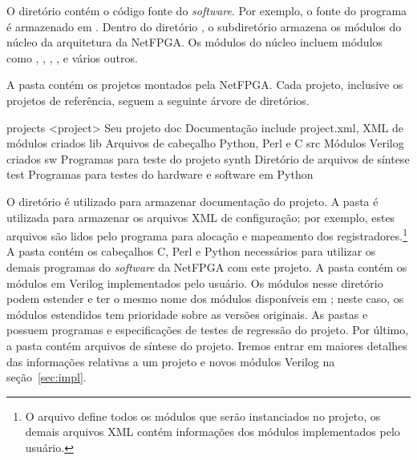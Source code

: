 O diretório  contém o código fonte do \emph{software}.  Por
exemplo, o fonte do programa  é armazenado em
.  Dentro do diretório , o
subdiretório  armazena os módulos do núcleo da
arquitetura da NetFPGA.  Os módulos do núcleo incluem módulos como
, , ,
,  e vários outros.

A pasta  contém os projetos montados pela NetFPGA.
Cada projeto, inclusive os projetos de referência, seguem a seguinte
árvore de diretórios.

\begin{verbnobox}[\footnotesize]
   projects
      <project>        {Seu projeto}
         doc           {Documentação}
         include       {project.xml, XML de módulos criados}
         lib           {Arquivos de cabeçalho Python, Perl e C}
         src           {Módulos Verilog criados}
         sw            {Programas para teste do projeto}
         synth         {Diretório de arquivos de síntese}
         test          {Programas para testes do hardware e software em Python}
\end{verbnobox}

O diretório  é utilizado para armazenar documentação do
projeto.  A pasta  é utilizada para armazenar os
arquivos XML de configuração; por exemplo, estes arquivos são lidos
pelo programa  para alocação e mapeamento dos
registradores.\footnote{O arquivo  define
todos os módulos que serão instanciados no projeto, os demais
arquivos XML contém informações dos módulos implementados pelo
usuário.}  A pasta  contém os cabeçalhos C, Perl e Python
necessários para utilizar os demais programas do \emph{software} da
NetFPGA com este projeto.\footnotemark{} A pasta  contém os
módulos em Verilog implementados pelo usuário.  Os módulos nesse
diretório podem estender e ter o mesmo nome dos módulos disponíveis
em ; neste caso, os módulos estendidos
tem prioridade sobre as versões originais.  As pastas  e
 possuem programas e especificações de testes de regressão
do projeto.  Por último, a pasta  contém arquivos de
síntese do projeto.  Iremos entrar em maiores detalhes das
informações relativas a um projeto e novos módulos Verilog na
seção~\ref{sec:impl}.


